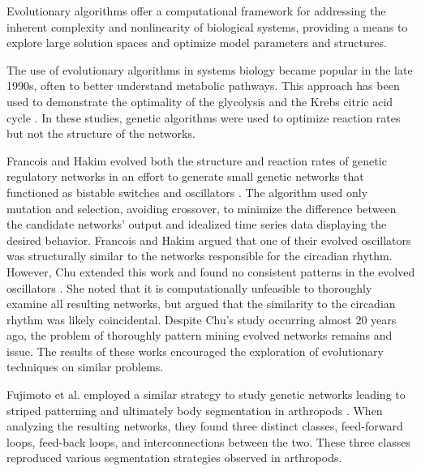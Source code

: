 \documentclass[12pt]{report}
\begin{document}
Evolutionary algorithms offer a computational framework for addressing the inherent complexity and nonlinearity of biological systems, providing a means to explore large solution spaces and optimize model parameters and structures.



The use of evolutionary algorithms in systems biology became popular in the late 1990s, often to better understand metabolic pathways. This approach has been used to demonstrate the optimality of the glycolysis \cite{Heinrich1999, stephani1999} and the Krebs citric acid cycle \cite{mittenthal2000}. In these studies, genetic algorithms were used to optimize reaction rates but not the structure of the networks.

Francois and Hakim evolved both the structure and reaction rates of genetic regulatory networks in an effort to generate small genetic networks that functioned as bistable switches and oscillators \cite{francois_hakim_2004}. The  algorithm used only mutation and selection, avoiding crossover, to minimize the difference between the candidate networks' output and idealized time series data displaying the desired behavior. Francois and Hakim argued that one of their evolved oscillators was structurally similar to the networks responsible for the circadian rhythm. However, Chu extended this work and found no consistent patterns in the evolved oscillators \cite{Chu_oscillator}. She noted that it is computationally unfeasible to thoroughly examine all resulting networks, but argued that the similarity to the circadian rhythm was likely coincidental. Despite Chu's study occurring almost 20 years ago, the problem of thoroughly pattern mining evolved networks remains and issue. The results of these works encouraged the exploration of evolutionary techniques on similar problems.

Fujimoto et al. employed a similar strategy to study genetic networks leading to striped patterning and ultimately body segmentation in arthropods \cite{fujimoto_network_2008}. When analyzing the resulting networks, they found three distinct classes, feed-forward loops, feed-back loops, and interconnections between the two. These three classes reproduced various segmentation strategies observed in arthropods.
\end{document}
